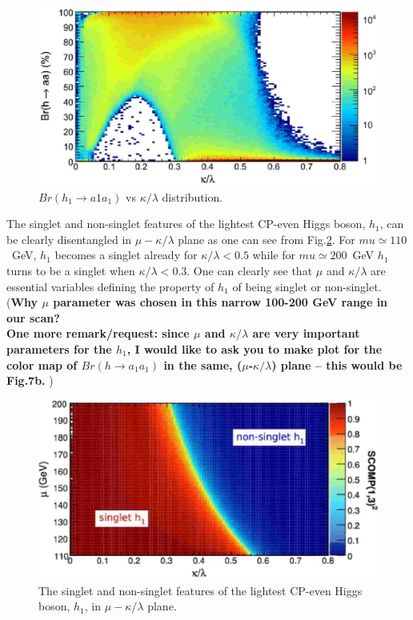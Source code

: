 \documentclass[aps,12pt,superscriptaddress,nofootinbib,floatfix,showpacs]{revtex4}
\begin{document}
\begin{figure}[htb]
\begin{center}
\includegraphics[width=0.75\linewidth]{plots/br-h-aa_vs_kap-lam.eps}
\caption{ $Br(h_1\to a1 a_1)$ vs  $\kappa/\lambda$
distribution.
\label{br-h-aa_vs_kap-lam}}
\end{center}
\end{figure}
The singlet and non-singlet 
features of the lightest CP-even Higgs boson, $h_1$,
can be clearly disentangled in $\mu-\kappa/\lambda$
plane as one can see from Fig.\ref{mu-kaplam-scomp}.
For  $mu\simeq 110$~GeV,
$h_1$
becomes a singlet already for $\kappa/\lambda<0.5$ while for  $mu\simeq 200$~GeV
$h_1$ turns to be a singlet when $\kappa/\lambda<0.3$.
One can clearly see that $\mu$ and $\kappa/\lambda$
are essential variables defining the property of $h_1$
of being  singlet or non-singlet. 
({\bf Why $\mu$ parameter was chosen in this narrow 100-200 GeV
range in our scan?\\
 One more remark/request: since  $\mu$ and $\kappa/\lambda$
 are very important parameters for the $h_1$, I would like to ask you to make
 plot
for the  color map of  $Br(h \to a_1 a_1)$
 in the same, ($\mu$-$\kappa/\lambda$) plane  -- this would be Fig.7b.
 })
\begin{figure}[htb]
\begin{center}
\includegraphics[width=0.75\linewidth]{plots/mu-kaplam-scomp.eps}
\caption{The singlet and non-singlet 
features of the lightest CP-even Higgs boson, $h_1$, 
in $\mu-\kappa/\lambda$
plane.
\label{mu-kaplam-scomp}}
\end{center}
\end{figure}
\end{document}
